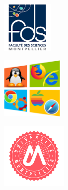 \documentclass[9pt]{beamer}
\begin{document}
\begin{withoutheadline}

    \begin{frame}
      \titlepage
      \begin{minipage}[c]{.1\linewidth}
            \begin{center}
                \includegraphics[width=2.5cm]{./figures/facSciences.png}
            \end{center}
       \end{minipage} 
       \hfill
       \begin{minipage}[c]{.46\linewidth}
            \begin{center}
                \includegraphics[width=3cm]{./figures/icone.png}
            \end{center}
        \end{minipage}
        \begin{minipage}[c]{.26\linewidth}
            \begin{center}
                \includegraphics[width=3.2cm]{./figures/umontpellier.png}
            \end{center}
        \end{minipage}
    \end{frame}
    
\end{withoutheadline}
\end{document}
